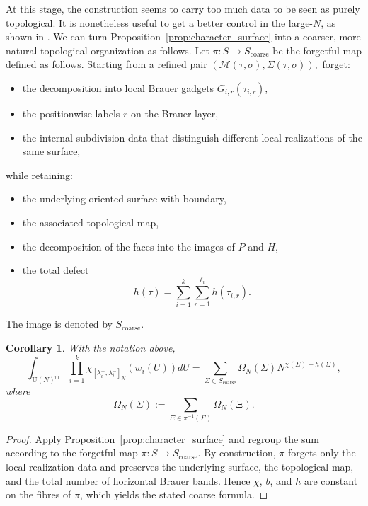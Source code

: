 \documentclass[11pt,a4paper,reqno]{article}
\newtheorem{corollary}[theorem]{Corollary}
\theoremstyle{definition}
\theoremstyle{remark}
\newcommand\U{{\mathrm U}}
\newcommand\M{{\mathcal{M}}}
\begin{document}
At this stage, the construction seems to carry too much data to be seen as purely topological. It is nonetheless useful to get a better control in the large-$N$, as shown in \cite{Mag2,Dah26}. We can turn Proposition~\ref{prop:character_surface} into a coarser, more natural topological organization as follows. Let $\pi:S\longrightarrow S_{\mathrm{coarse}}$ be the forgetful map defined as follows. Starting from a refined pair $(\M(\tau,\sigma), \Sigma(\tau,\sigma)),$ forget:
\begin{itemize}
\item the decomposition into local Brauer gadgets $G_{i,r}(\tau_{i,r})$,
\item the positionwise labels $r$ on the Brauer layer,
\item the internal subdivision data that distinguish different local realizations of the same surface,
\end{itemize}
while retaining:
\begin{itemize}
\item the underlying oriented surface with boundary,
\item the associated topological map,
\item the decomposition of the faces into the images of $P$ and $H$,
\item the total defect
\[
h(\tau)=\sum_{i=1}^k\sum_{r=1}^{\ell_i} h(\tau_{i,r}).
\]
\end{itemize}
The image is denoted by $S_{\mathrm{coarse}}$.

\begin{corollary}\label{cor:coarse-capped-quotient}
With the notation above,
\begin{equation}
\int_{\U(N)^m}\prod_{i=1}^k \chi_{[\lambda_i^+,\lambda_i^-]_N}(w_i(U))dU=\sum_{\Sigma\in S_{\mathrm{coarse}}}\Omega_N(\Sigma)N^{\chi(\Sigma)-h(\Sigma)},
\end{equation}
where
\[
\Omega_N(\Sigma):=\sum_{\Xi\in \pi^{-1}(\Sigma)}\Omega_N(\Xi).
\]
\end{corollary}

\begin{proof}
Apply Proposition~\ref{prop:character_surface} and regroup the sum according to the forgetful map $\pi:S\to S_{\mathrm{coarse}}$. By construction, $\pi$ forgets only the local realization data and preserves the underlying surface, the topological map, and the total number of horizontal Brauer bands. Hence $\chi$, $b$, and $h$ are constant on the fibres of $\pi$, which yields the stated coarse formula.
\end{proof}
\end{document}
